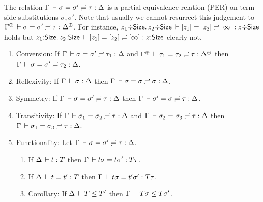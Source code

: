 \documentclass[acmsmall,screen]{acmart}\settopmatter{}
\newcommand{\LONGVERSION}[1]{}
\begin{document}
The relation $\Gamma \,\vdash \sigma = \sigma' \risingdotseq \tau : \Delta$ is a partial equivalence
relation (PER) on term-side substitutions $\sigma,\sigma'$. Note that
usually we cannot resurrect this judgement to
$\sueq{\resurrect\Gamma}{\sigma}{\sigma'}\tau {\resurrect\Delta}$.
For instance,
$z_1 {\div} \mathsf{Size}.\,z_2 {\div} \mathsf{Size} \,\vdash [z_1] = [z_2] \risingdotseq [\infty] : z {\div} \mathsf{Size}$
holds but
$z_1 {:} \mathsf{Size}.\,z_2 {:} \mathsf{Size} \,\vdash [z_1] = [z_2] \risingdotseq [\infty] : z {:} \mathsf{Size}$
clearly not.
\begin{lemma}
\label{lem:subeq}\bla
\begin{enumerate}
\item Conversion: If\/ $\Gamma \,\vdash \sigma = \sigma' \risingdotseq \tau_1 : \Delta$ and $\sueq {\resurrect\Gamma} {\tau_1} {\tau_2} {\tau} {\resurrect\Delta}$ then $\Gamma \,\vdash \sigma = \sigma' \risingdotseq \tau_2 : \Delta$.
\item Reflexivity: If\/ $\Gamma \,\vdash \sigma : \Delta$ then $\Gamma \,\vdash \sigma = \sigma \risingdotseq \sigma : \Delta$.
\item Symmetry:  If\/ $\sueq \Gamma \sigma {\sigma'} {\tau} \Delta$ then $\Gamma \,\vdash \sigma' = \sigma \risingdotseq \tau : \Delta$.
\item Transitivity:  If\/ $\Gamma \,\vdash \sigma_1 = \sigma_2 \risingdotseq \tau : \Delta$ and $\Gamma \,\vdash \sigma_2 = \sigma_3 \risingdotseq \tau : \Delta$ then $\Gamma \,\vdash \sigma_1 = \sigma_3 \risingdotseq \tau : \Delta$.
\item Functionality: Let $\Gamma \,\vdash \sigma = \sigma' \risingdotseq \tau : \Delta$.
  \begin{enumerate}
  \item
  If\/ $\Delta \,\vdash t : T$ then $\Gamma \,\vdash t\sigma = t\sigma' : T\tau$.
  \item
  If\/ $\Delta \,\vdash t = t' : T$ then $\Gamma \,\vdash t\sigma = t'\sigma' : T\tau$.
  \item
  Corollary: If\/ $\Delta \,\vdash T \leq T'$ then $\Gamma \,\vdash T\sigma \leq T\sigma'$.
  \end{enumerate}
\end{enumerate}
\end{lemma}

\LONGVERSION{
\begin{corollary}[Partial resurrection for substitution equality]
  If\/ $\sueq \Gamma \sigma {\sigma'} {\tau} \Delta$ then
  $\sueq {\resurrect \Gamma} \tau \tau \tau {\resurrect \Delta}$.
\end{corollary}
}
\end{document}
